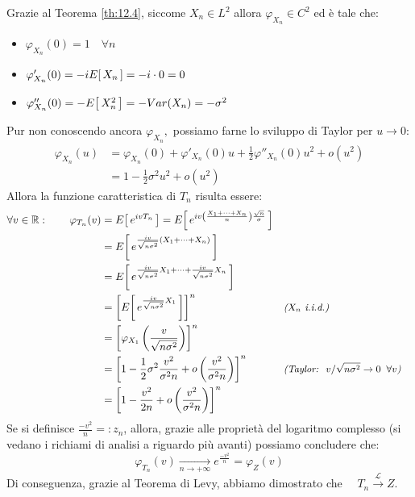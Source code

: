 \begin{teorema}
\begin{dimostrazione}
        \medskip 
        Grazie al Teorema \ref{th:12.4}, siccome $X_n\in L^2$ allora $\varphi_{X_n} \in C^2$ ed è tale che:
        \begin{itemize}
            \item $\varphi_{X_n}(0) = 1\quad \forall n$
            \item $\varphi_{X_n}'(0) = -iE\!\left[\,X_n\,\right] = -i\cdot 0 = 0$
            \item $\varphi_{X_n}''(0) = -E\!\left[\,X_n^2\,\right] = -Var(X_n) = -\sigma^2$
        \end{itemize}
        Pur non conoscendo ancora $\varphi_{X_n}, $ possiamo farne lo sviluppo di Taylor per $u\to0$:
        \begin{align*}
            \varphi_{X_n}(u) & = \varphi_{X_n}(0) + \varphi'_{X_n}(0) u + \frac12 \varphi''_{X_n}(0) u^2 + o(u^2) \\
            & = 1-\frac12 \sigma^2u^2 + o(u^2)
        \end{align*}
        Allora la funzione caratteristica di $T_n$ risulta essere:
        \begin{align*}
            \forall v\in \mathbb R:\qquad \varphi_{T_n}(v) & = E\!\left[\,e^{ivT_n}\,\right] = E\!\left[\,e^{iv \left(\frac{X_1 + \cdots + X_n}{n}\right)\frac{\sqrt{n}}{\sigma}}\,\right]\\
            & = E\!\left[\,e^{\frac{iv}{\sqrt{n\sigma^2}}(X_1+\cdots +X_n)}\,\right] \\
            & = E\!\left[\,e^{\frac{iv}{\sqrt{n\sigma^2}}X_1 + \cdots + \frac{iv}{\sqrt{n\sigma^2}} X_n}\,\right]\\
            & = \left[E\!\left[\,e^{\frac{iv}{\sqrt{n\sigma^2}}X_1}\,\right]\right]^n && \textit{\small($X_n$ i.i.d.)}\\
            & = \left[\varphi_{X_1}\left(\frac{v}{\sqrt{n\sigma^2}}\right)\right]^n \\
            & = \left[1-\frac12 \sigma^2\frac{v^2}{\sigma^2 n} + o\left(\frac{v^2}{\sigma^2 n}\right)\right]^n &&\textit{\small (Taylor: $\;v/\sqrt{n\sigma^2}\to 0\;\;\forall v$)}\\
            & = \left[1-\frac{v^2}{2 n} + o\left(\frac{v^2}{\sigma^2 n}\right)\right]^n
        \end{align*}
        Se si definisce $\frac{-v^2}{n} =: z_n$, allora, grazie alle proprietà del logaritmo complesso (si vedano i richiami di analisi a riguardo più avanti) possiamo concludere che:
        \[\varphi_{T_n}(v) \underset{n\to+\infty}{\longrightarrow} e^{\frac{-v^2}{n}} = \varphi_Z(v)\]
        Di conseguenza, grazie al Teorema di Levy, abbiamo dimostrato che $\quad T_n \overset{\mathcal{L}}{\longrightarrow} Z$.
    \end{dimostrazione}
\end{teorema}

